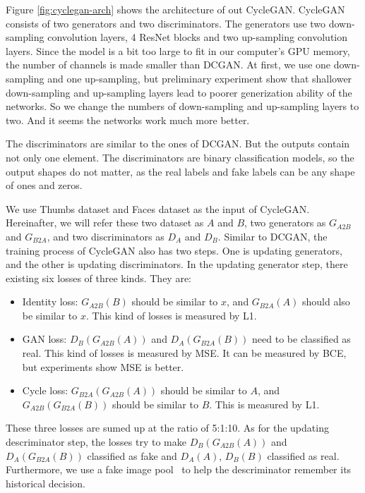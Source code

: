 \documentclass[10pt,twocolumn,letterpaper]{article}
\begin{document}
Figure \ref{fig:cyclegan-arch} shows the architecture of out CycleGAN. CycleGAN
consists of two generators and two discriminators. The generators use two
down-sampling convolution layers, 4 ResNet blocks and two up-sampling
convolution layers. Since the model is a bit too large to fit in our computer's
GPU memory, the number of channels is made smaller than DCGAN. At first, we use
one down-sampling and one up-sampling, but preliminary experiment show that
shallower down-sampling and up-sampling layers lead to poorer generization
ability of the networks. So we change the numbers of down-sampling and
up-sampling layers to two. And it seems the networks work much more better.

The discriminators are similar to the ones of DCGAN. But the outputs contain
not only one element. The discriminators are binary classification models, so
the output shapes do not matter, as the real labels and fake labels can be any
shape of ones and zeros.

We use Thumbs dataset and Faces dataset as the input of CycleGAN. Hereinafter,
we will refer these two dataset as $A$ and $B$, two generators as $G_{A2B}$ and
$G_{B2A}$, and two discriminators as $D_A$ and $D_B$. Similar to DCGAN, the
training process of CycleGAN also has two steps. One is updating generators, and
the other is updating discriminators. In the updating generator step, there
existing six losses of three kinds. They are:
\begin{itemize}[noitemsep, topsep=0pt]
   \item Identity loss: $G_{A2B}(B)$ should be similar to $x$, and $G_{B2A}(A)$
   should also be similar to $x$. This kind of losses is measured by L1.
   \item GAN loss: $D_B(G_{A2B}(A))$ and $D_A(G_{B2A}(B))$ need to be classified
   as real. This kind of losses is measured by MSE. It can be measured by BCE,
   but experiments show MSE is better.
   \item Cycle loss: $G_{B2A}(G_{A2B}(A))$ should be similar to $A$, and
   $G_{A2B}(G_{B2A}(B))$ should be similar to $B$. This is measured by L1.
\end{itemize}
These three losses are sumed up at the ratio of 5:1:10. As for the updating
descriminator step, the losses try to make $D_B(G_{A2B}(A))$ and
$D_A(G_{B2A}(B))$ classified as fake and $D_A(A)$, $D_B(B)$ classified as real.
Furthermore, we use a fake image pool~\cite{shrivastava2017learning} to help the
descriminator remember its historical decision.
\end{document}
